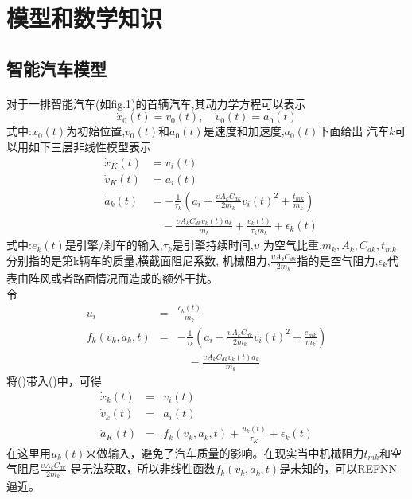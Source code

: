 \documentclass{cjc}
\begin{document}
\section{模型和数学知识}

  \subsection{智能汽车模型}
  \paragraph{}对于一排智能汽车(如fig.1)的首辆汽车,其动力学方程可以表示\:
  \begin{equation} \dot{x}_0(t)=v_0(t),\quad \dot{v}_0(t)=a_0(t) \end{equation}
  式中:$x_0(t)$为初始位置,$v_0(t)$和$a_0(t)$是速度和加速度,$a_0(t)$下面给出
  汽车$k$可以用如下三层非线性模型表示\:
  \begin{eqnarray}
    &\dot{x}_K(t) &= v_i(t) \nonumber \\
    &\dot{v}_K(t) &= a_i(t) \nonumber \\
    &\dot{a}_k(t) &=-\frac{1}{\tau_k}(a_i+\frac{\upsilon A_k C_{dk}}{2m_k} v_i(t)^2+\frac{t_{mk}}{m_k}) \nonumber \\
    &&\quad  -\frac{\upsilon A_k C_{dk} v_k(t) a_k}{m_k} + \frac{e_k(t)}{\tau_k m_k}+\epsilon _k(t)    
  \end{eqnarray}
  式中:$e_k (t)$是引擎/刹车的输入,$\tau _k$是引擎持续时间,$\upsilon$ 为空气比重,$m_k,A_k,C_{dk},t_{mk}$分别指的是第k辆车的质量,横截面阻尼系数,
  机械阻力,$\frac{\upsilon A_k C_{dk}}{2m_k}$指的是空气阻力,$\epsilon _k$代表由阵风或者路面情况而造成的额外干扰。\\
  令
  \begin{eqnarray}
    u_i &=& \frac{c_k(t)}{m_k} \nonumber \\
    f_k(v_k,a_k,t) &=& -\frac{1}{\tau _k}(a_i+\frac{\upsilon A_k C_{dk}}{2m_k} v_i(t)^2+\frac{e_{mk}}{m_k}) \nonumber \\
    &&\quad -\frac{\upsilon A_k C_{dk} v_k(t) a_k}{m_k}
    \end{eqnarray}
    将()带入()中，可得\:
    \begin{eqnarray}
      \dot{x}_k(t) &=& v_i(t) \nonumber \\
      \dot{v}_k(t) &=& a_i(t) \nonumber \\
      \dot{a}_K(t) &=& f_k(v_k,a_k,t) + \frac{u_k(t)}{\tau _K} + \epsilon _k(t)
    \end{eqnarray}
    在这里用$u_k(t)$来做输入，避免了汽车质量的影响。在现实当中机械阻力$t_{mk}$和空气阻尼$\frac{\upsilon A_k C_{dk}}{2m_k}$
    是无法获取，所以非线性函数$f_k(v_k,a_k,t)$是未知的，可以REFNN逼近。
\end{document}
